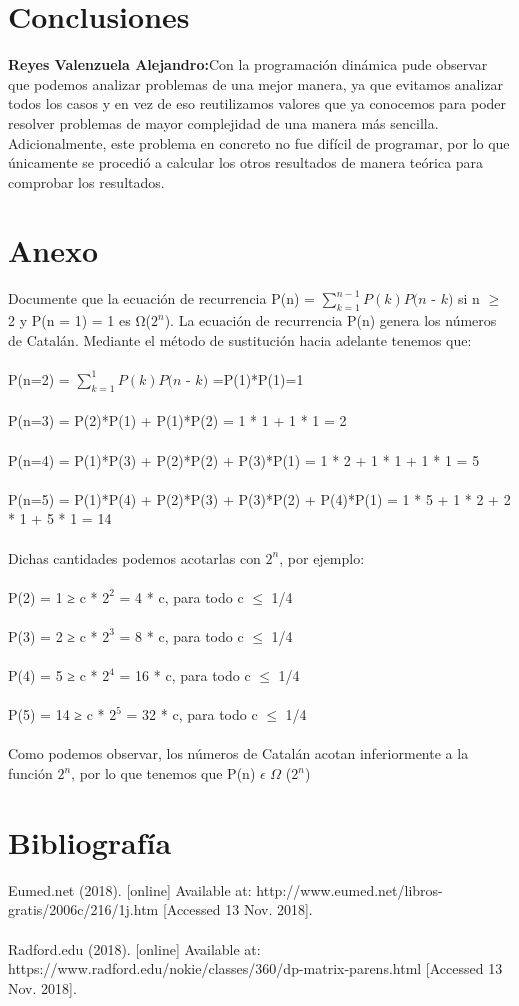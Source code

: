 \documentclass[12pt,twoside]{article}
\begin{document}
\section{Conclusiones}
{\bf{Reyes Valenzuela Alejandro:}}Con la programaci\'on din\'amica pude observar que podemos analizar problemas de una mejor manera, ya que evitamos analizar todos los casos y en vez de eso reutilizamos valores que ya conocemos para poder resolver problemas de mayor complejidad de una manera m\'as sencilla. Adicionalmente, este problema en concreto no fue dif\'icil de programar, por lo que \'unicamente se procedi\'o a calcular los otros resultados de manera te\'orica para comprobar los resultados.\newpage
\section{Anexo}
Documente que la ecuaci\'on de recurrencia P(n) = $\sum_{k=1}^{n-1}P(k)P(n$ - $k)$ si n $\geq$ 2 y P(n = 1) = 1 es Ω($2^{n}$). La ecuaci\'on de recurrencia P(n) genera los n\'umeros de Catal\'an.
Mediante el m\'etodo de sustitución hacia adelante tenemos que:\\\\
P(n=2) = $\sum_{k=1}^{1}P(k)P(n$ - $k)$ =P(1)*P(1)=1\\\\
P(n=3) = P(2)*P(1) + P(1)*P(2) = 1 * 1 + 1 * 1 = 2\\\\
P(n=4) = P(1)*P(3) + P(2)*P(2) + P(3)*P(1) =  1 * 2 + 1 * 1 + 1 * 1 = 5\\\\
P(n=5) = P(1)*P(4) + P(2)*P(3) + P(3)*P(2) + P(4)*P(1) = 1 * 5 + 1 * 2 + 2 * 1 + 5 * 1 = 14\\\\
Dichas cantidades podemos acotarlas con $2^{n}$, por ejemplo:\\\\
P(2) = 1 ≥ c * $2^{2}$ = 4 * c, para todo c $\leq$ 1/4\\\\
P(3) = 2 ≥ c * $2^{3}$ = 8 * c, para todo c $\leq$ 1/4\\\\
P(4) = 5 ≥ c * $2^{4}$ = 16 * c, para todo c $\leq$ 1/4\\\\
P(5) = 14 ≥ c * $2^{5}$ = 32 * c, para todo c $\leq$ 1/4\\\\
Como podemos observar, los n\'umeros de Catal\'an acotan inferiormente a la funci\'on $2^{n}$, por lo que tenemos que P(n) $\epsilon$ $\Omega$ ($2^{n}$)
\section{Bibliograf\'ia}
Eumed.net (2018). [online] Available at: http://www.eumed.net/libros-gratis/2006c/216/1j.htm [Accessed 13 Nov. 2018].\\\\
Radford.edu (2018). [online] Available at: https://www.radford.edu/nokie/classes/360/dp-matrix-parens.html [Accessed 13 Nov. 2018].\\\\
\end{document}
